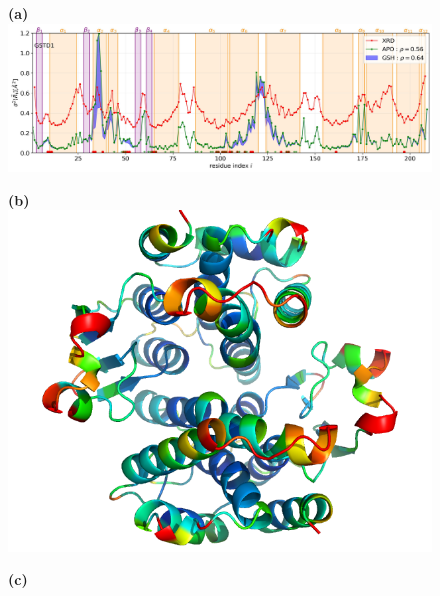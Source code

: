 \begin{figure}[h!]
	\begin{minipage}{\linewidth}
		\textbf{(a)}\\
		\includegraphics[width=\textwidth]{figures/GSTD1_APO+GSH_MSF.jpg}
	\end{minipage}
	\begin{minipage}{.49\linewidth}
		\textbf{(b)}\\
		
		\centering
		\includegraphics[width=.8\textwidth]{figures/GSTD1_APO_MSF.png}
	\end{minipage}
	\begin{minipage}{.49\linewidth}
		\textbf{(c)}\\
		

\end{minipage}
\end{figure}

